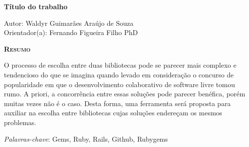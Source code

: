 \begin{center}
	{\Large{\textbf{Título do trabalho}}}
\end{center}

\vspace{1cm}

\begin{flushright}
	Autor: Waldyr Guimarães Araújo de Souza\\
	Orientador(a): Fernando Figueira Filho PhD
\end{flushright}

\vspace{1cm}

\begin{center}
	\Large{\textsc{\textbf{Resumo}}}
\end{center}

\noindent O processo de escolha entre duas bibliotecas pode se parecer mais complexo e tendencioso do que se imagina quando levado em consideração o concurso de popularidade em que o desenvolvimento colaborativo de software livre tomou rumo. A priori, a concorrência entre essas soluções pode parecer benéfica, porém muitas vezes não é o caso. Desta forma, uma ferramenta será proposta para auxiliar na escolha entre bibliotecas cujas soluções endereçam os mesmos problemas.

\noindent\textit{Palavras-chave}: Gems, Ruby, Rails, Github, Rubygems